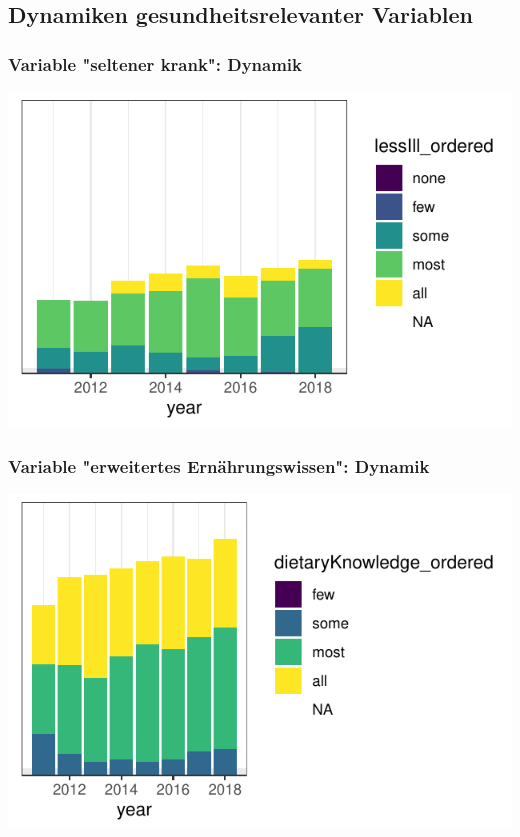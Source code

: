 \subsection{Dynamiken gesundheitsrelevanter Variablen}

\begin{frame}[fragile]
\frametitle{Variable "seltener krank": Dynamik}
\begin{knitrout}\footnotesize
{}\color{fgcolor}

{\centering \includegraphics[width=\maxwidth]{figure/beamer-lessIllTime-1} 

}



\end{knitrout}
\end{frame}

\begin{frame}[fragile]
\frametitle{Variable "erweitertes Ernährungswissen": Dynamik}
\begin{knitrout}\footnotesize
{}\color{fgcolor}

{\centering \includegraphics[width=\maxwidth]{figure/beamer-dietaryTime-1} 

}



\end{knitrout}
\end{frame}


